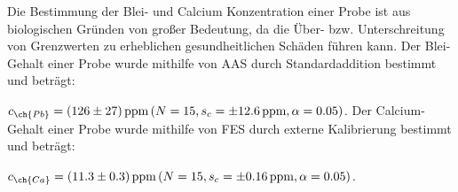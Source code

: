 Die Bestimmung der Blei- und Calcium Konzentration einer Probe ist aus biologischen Gründen von großer Bedeutung, da die Über- bzw. Unterschreitung von Grenzwerten zu erheblichen gesundheitlichen Schäden führen kann. Der Blei-Gehalt einer Probe wurde mithilfe von AAS durch Standardaddition bestimmt und beträgt: 

\noindent $c_{\ch{Pb}} = \SI[mode=text, multi-part-units = brackets, separate-uncertainty]{126(27)}{ppm} \left(N = 15, s_c = \pm \SI[mode=text]{12.6}{ppm}, \alpha = 0.05\right)$. Der Calcium-Gehalt einer Probe wurde mithilfe von FES durch externe Kalibrierung bestimmt und beträgt: 

\noindent $c_{\ch{Ca}} = \SI[mode=text, multi-part-units = brackets, separate-uncertainty]{11.3(3)}{ppm} \left(N = 15, s_c = \pm \SI[mode=text]{0.16}{ppm}, \alpha = 0.05\right)$.